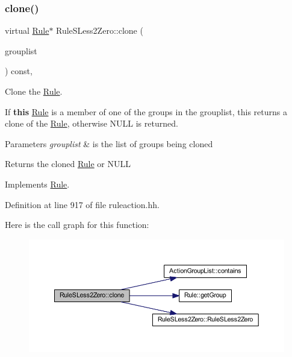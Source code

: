 \subsubsection{\texorpdfstring{clone()}{clone()}}
{\footnotesize\ttfamily virtual \mbox{\hyperlink{class_rule}{Rule}}$\ast$ Rule\+S\+Less2\+Zero\+::clone (\begin{DoxyParamCaption}\item[{const \mbox{\hyperlink{class_action_group_list}{Action\+Group\+List}} \&}]{grouplist }\end{DoxyParamCaption}) const\hspace{0.3cm}{\ttfamily [inline]}, {\ttfamily [virtual]}}



Clone the \mbox{\hyperlink{class_rule}{Rule}}. 

If {\bfseries{this}} \mbox{\hyperlink{class_rule}{Rule}} is a member of one of the groups in the grouplist, this returns a clone of the \mbox{\hyperlink{class_rule}{Rule}}, otherwise N\+U\+LL is returned. 
\begin{DoxyParams}{Parameters}
{\em grouplist} & is the list of groups being cloned \\
\hline
\end{DoxyParams}
\begin{DoxyReturn}{Returns}
the cloned \mbox{\hyperlink{class_rule}{Rule}} or N\+U\+LL 
\end{DoxyReturn}


Implements \mbox{\hyperlink{class_rule_a70de90a76461bfa7ea0b575ce3c11e4d}{Rule}}.



Definition at line 917 of file ruleaction.\+hh.

Here is the call graph for this function\+:
\nopagebreak
\begin{figure}[H]
\begin{center}
\leavevmode
\includegraphics[width=350pt]{class_rule_s_less2_zero_a8a7902b27cde82499a427eaf8d0e5dde_cgraph}
\end{center}
\end{figure}
\mbox{\label{class_rule_s_less2_zero_adaf1c83c1ef17227b4215ea9abea032a}} 
